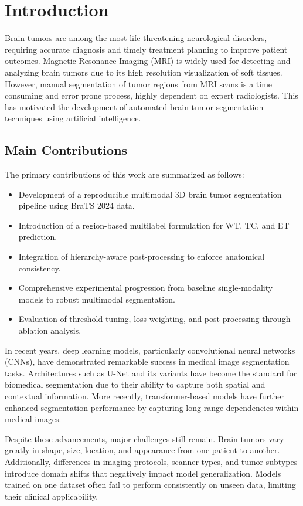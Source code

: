 \documentclass[conference]{IEEEtran}
\begin{document}
\section{Introduction}

Brain tumors are among the most life threatening neurological disorders, requiring accurate diagnosis and timely treatment planning to improve patient outcomes. Magnetic Resonance Imaging (MRI) is widely used for detecting and analyzing brain tumors due to its high resolution visualization of soft tissues. However, manual segmentation of tumor regions from MRI scans is a time consuming and error prone process, highly dependent on expert radiologists. This has motivated the development of automated brain tumor segmentation techniques using artificial intelligence.

	\subsection{Main Contributions}
	The primary contributions of this work are summarized as follows:
	\begin{itemize}
	\item Development of a reproducible multimodal 3D brain tumor segmentation pipeline using BraTS 2024 data.
	\item Introduction of a region-based multilabel formulation for WT, TC, and ET prediction.
	\item Integration of hierarchy-aware post-processing to enforce anatomical consistency.
	\item Comprehensive experimental progression from baseline single-modality models to robust multimodal segmentation.
	\item Evaluation of threshold tuning, loss weighting, and post-processing through ablation analysis.
	\end{itemize}

In recent years, deep learning models, particularly convolutional neural networks (CNNs), have demonstrated remarkable success in medical image segmentation tasks. Architectures such as U-Net and its variants have become the standard for biomedical segmentation due to their ability to capture both spatial and contextual information. More recently, transformer-based models have further enhanced segmentation performance by capturing long-range dependencies within medical images.

Despite these advancements, major challenges still remain. Brain tumors vary greatly in shape, size, location, and appearance from one patient to another. Additionally, differences in imaging protocols, scanner types, and tumor subtypes introduce domain shifts that negatively impact model generalization. Models trained on one dataset often fail to perform consistently on unseen data, limiting their clinical applicability.
\end{document}
